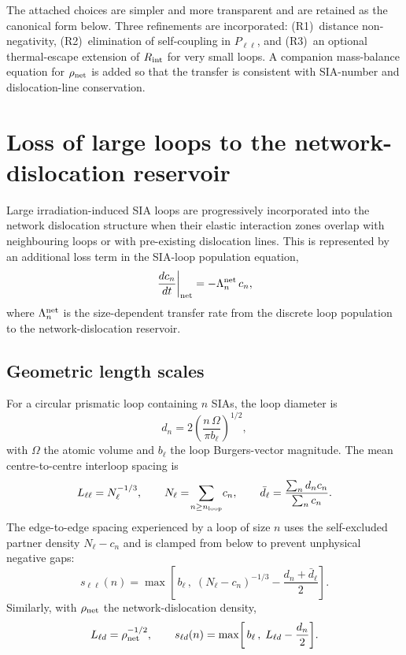 \documentclass[11pt,a4paper]{article}
\begin{document}
The attached choices are simpler and more transparent and are retained
as the canonical form below.  Three refinements are incorporated:
(R1)~distance non-negativity, (R2)~elimination of self-coupling in
$P_{\ell\ell}$, and (R3)~an optional thermal-escape extension of
$R_{\rm int}$ for very small loops.  A companion mass-balance equation
for $\rho_{\rm net}$ is added so that the transfer is consistent with
SIA-number and dislocation-line conservation.

\section*{Loss of large loops to the network-dislocation reservoir}

Large irradiation-induced SIA loops are progressively incorporated into
the network dislocation structure when their elastic interaction zones
overlap with neighbouring loops or with pre-existing dislocation lines.
This is represented by an additional loss term in the SIA-loop
population equation,
\begin{equation}
  \left.\frac{dc_n}{dt}\right|_{\rm net}=-\Lambda_n^{\rm net}\,c_n,
  \label{eq:loop_network_loss}
\end{equation}
where $\Lambda_n^{\rm net}$ is the size-dependent transfer rate from the
discrete loop population to the network-dislocation reservoir.

\subsection*{Geometric length scales}

For a circular prismatic loop containing $n$ SIAs, the loop diameter is
\begin{equation}
  d_n=2\!\left(\frac{n\,\Omega}{\pi b_\ell}\right)^{1/2},
  \label{eq:loop_diameter_from_n}
\end{equation}
with $\Omega$ the atomic volume and $b_\ell$ the loop Burgers-vector
magnitude.  The mean centre-to-centre interloop spacing is
\begin{equation}
  L_{\ell\ell}=N_\ell^{-1/3},\qquad
  N_\ell=\!\sum_{n\ge n_{\rm loop}}\!c_n,\qquad
  \bar d_\ell=\frac{\sum_n d_n c_n}{\sum_n c_n}.
  \label{eq:interloop_spacing}
\end{equation}
The edge-to-edge spacing experienced by a loop of size $n$ uses the
self-excluded partner density $N_\ell-c_n$ and is clamped from below to
prevent unphysical negative gaps:
\begin{equation}
  s_{\ell\ell}(n)=\max\!\left[\,b_\ell\,,\;
  (N_\ell-c_n)^{-1/3}-\frac{d_n+\bar d_\ell}{2}\right]\!.
  \label{eq:loop_loop_spacing}
\end{equation}
Similarly, with $\rho_{\rm net}$ the network-dislocation density,
\begin{equation}
  L_{\ell d}=\rho_{\rm net}^{-1/2},\qquad
  s_{\ell d}(n)=\max\!\left[\,b_\ell\,,\;
  L_{\ell d}-\frac{d_n}{2}\right]\!.
  \label{eq:loop_network_spacing}
\end{equation}
\end{document}
